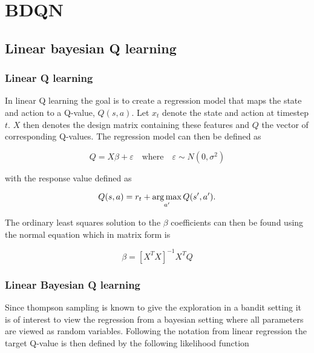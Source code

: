 \chapter{BDQN}{\label{ch:ube}}

\section{Linear bayesian Q learning}

\subsection{Linear Q learning}

In linear Q learning the goal is to create a regression model that maps the state and action to a Q-value, $Q(s,a)$. Let $x_t$ denote the state and action at timestep $t$. $X$ then denotes the design matrix containing these features and $Q$ the vector of corresponding Q-values. The regression model can then be defined as

\begin{equation*}
	Q = X\beta + \varepsilon \quad \text{where} \quad \varepsilon \sim N(0,\sigma^2)
\end{equation*}

with the response value defined as 

\begin{equation}
    \label{eq:q_target}
	Q(s,a) = r_t + \operatorname*{arg\,max}_{a'}Q(s',a').
\end{equation}

The ordinary least squares solution to the $\beta$ coefficients can then be found using the normal equation which in matrix form is

\begin{equation*}
	\beta = [X^TX]^{-1}X^TQ
\end{equation*}

\subsection{Linear Bayesian Q learning}

Since thompson sampling is known to give the exploration in a bandit setting it is of interest to view the regression from a bayesian setting where all parameters are viewed as random variables. Following the notation from linear regression the target Q-value is then defined by the following likelihood function


